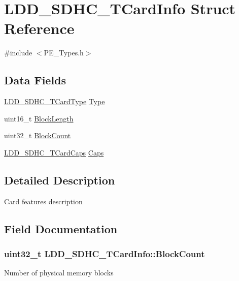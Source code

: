 \hypertarget{struct_l_d_d___s_d_h_c___t_card_info}{}\section{L\+D\+D\+\_\+\+S\+D\+H\+C\+\_\+\+T\+Card\+Info Struct Reference}
\label{struct_l_d_d___s_d_h_c___t_card_info}


{\ttfamily \#include $<$P\+E\+\_\+\+Types.\+h$>$}

\subsection*{Data Fields}
\begin{DoxyCompactItemize}
\item 
\hyperlink{group___p_e___types__module_ga5344ded013ca3da273ed4f52c9c96fc7}{L\+D\+D\+\_\+\+S\+D\+H\+C\+\_\+\+T\+Card\+Type} \hyperlink{struct_l_d_d___s_d_h_c___t_card_info_ab2b86f6fe821778459edd351d08eb4bd}{Type}
\item 
uint16\+\_\+t \hyperlink{struct_l_d_d___s_d_h_c___t_card_info_a46cbdea4ece83eeaa17410e9763cc3a9}{Block\+Length}
\item 
uint32\+\_\+t \hyperlink{struct_l_d_d___s_d_h_c___t_card_info_aaf0587f4fc0e52a160d0ac2a1106c4e9}{Block\+Count}
\item 
\hyperlink{struct_l_d_d___s_d_h_c___t_card_caps}{L\+D\+D\+\_\+\+S\+D\+H\+C\+\_\+\+T\+Card\+Caps} \hyperlink{struct_l_d_d___s_d_h_c___t_card_info_a591c22d1aa49944325b35c63d2bf8199}{Caps}
\end{DoxyCompactItemize}


\subsection{Detailed Description}
Card features description 

\subsection{Field Documentation}
\hypertarget{struct_l_d_d___s_d_h_c___t_card_info_aaf0587f4fc0e52a160d0ac2a1106c4e9}{}
\subsubsection[{Block\+Count}]{\setlength{\rightskip}{0pt plus 5cm}uint32\+\_\+t L\+D\+D\+\_\+\+S\+D\+H\+C\+\_\+\+T\+Card\+Info\+::\+Block\+Count}\label{struct_l_d_d___s_d_h_c___t_card_info_aaf0587f4fc0e52a160d0ac2a1106c4e9}
Number of physical memory blocks \hypertarget{struct_l_d_d___s_d_h_c___t_card_info_a46cbdea4ece83eeaa17410e9763cc3a9}{}
